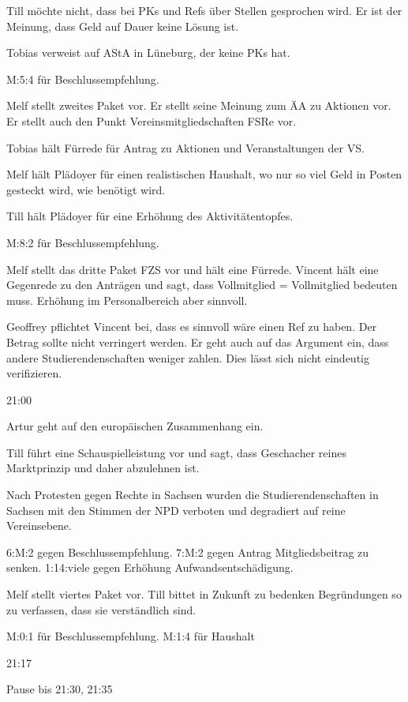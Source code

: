 \documentclass[ngerman,headheight=70pt]{scrartcl}
\begin{document}
    Till möchte nicht, dass bei PKs und Refs über Stellen gesprochen wird.
    Er ist der Meinung, dass Geld auf Dauer keine Lösung ist.

    Tobias verweist auf AStA in Lüneburg, der keine PKs hat.

    M:5:4 für Beschlussempfehlung.

    Melf stellt zweites Paket vor. Er stellt seine Meinung zum ÄA zu Aktionen
    vor. Er stellt auch den Punkt Vereinsmitgliedschaften FSRe vor.

    Tobias hält Fürrede für Antrag zu Aktionen und Veranstaltungen der VS.

    Melf hält Plädoyer für einen realistischen Haushalt, wo nur so viel
    Geld in Posten gesteckt wird, wie benötigt wird.

    Till hält Plädoyer für eine Erhöhung des Aktivitätentopfes.

    M:8:2 für Beschlussempfehlung.

    Melf stellt das dritte Paket FZS vor und hält eine Fürrede. Vincent hält
    eine Gegenrede zu den Anträgen und sagt, dass Vollmitglied = Vollmitglied
    bedeuten muss. Erhöhung im Personalbereich aber sinnvoll.

    Geoffrey pflichtet Vincent bei, dass es sinnvoll wäre einen Ref zu haben.
    Der Betrag sollte nicht verringert werden. Er geht auch auf das Argument ein,
    dass andere Studierendenschaften weniger zahlen. Dies lässt sich nicht
    eindeutig verifizieren.

    21:00

    Artur geht auf den europäischen Zusammenhang ein.

    Till führt eine Schauspielleistung vor und sagt, dass Geschacher reines
    Marktprinzip und daher abzulehnen ist.

    Nach Protesten gegen Rechte in Sachsen wurden die Studierendenschaften
    in Sachsen mit den Stimmen der NPD verboten und degradiert auf reine
    Vereinsebene.

    6:M:2 gegen Beschlussempfehlung.
    7:M:2 gegen Antrag Mitgliedsbeitrag zu senken.
    1:14:viele gegen Erhöhung Aufwandsentschädigung.

    Melf stellt viertes Paket vor. Till bittet in Zukunft zu bedenken Begründungen
    so zu verfassen, dass sie verständlich sind.

    M:0:1 für Beschlussempfehlung.
    M:1:4 für Haushalt

    21:17

    Pause bis 21:30, 21:35
\end{document}
